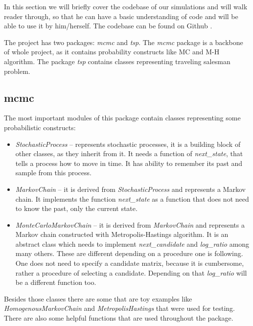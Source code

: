 In this section we will briefly cover the codebase of our simulations and will walk reader through, so that he can have a basic understanding of code and will be able to use it by him/herself. The codebase can be found on Github \cite{Homeomor72:online}. 

The project has two packages: \textit{mcmc} and \textit{tsp}. The \textit{mcmc} package is a backbone of whole project, as it contains probability constructs like MC and M-H algorithm. The package \textit{tsp} contains classes representing traveling salesman problem.

\subsection{mcmc}
	The most important modules of this package contain classes representing some probabilistic constructs:
	\begin{itemize}
		\item \textit{StochasticProcess} -- represents stochastic processes, it is a building block of other classes, as they inherit from it. It needs a function of \textit{next\_state}, that tells a process how to move in time. It has ability to remember its past and sample from this process.
		\item \textit{MarkovChain} -- it is derived from \textit{StochasticProcess} and represents a Markov chain. It implements the function \textit{next\_state} as a function that does not need to know the past, only the current state.
		\item \textit{MonteCarloMarkovChain} -- it is derived from \textit{MarkovChain} and represents a Markov chain constructed with Metropolis-Hastings algorithm. It is an abstract class which needs to implement \textit{next\_candidate} and \textit{log\_ratio} among many others. These are different depending on a procedure one is following. One does not need to specify a candidate matrix, because it is cumbersome, rather a procedure of selecting a candidate. Depending on that \textit{log\_ratio} will be a different function too.
	\end{itemize}

Besides those classes there are some that are toy examples like \textit{HomogenousMarkovChain} and \textit{MetropolisHastings} that were used for testing. There are also some helpful functions that are used throughout the package.

